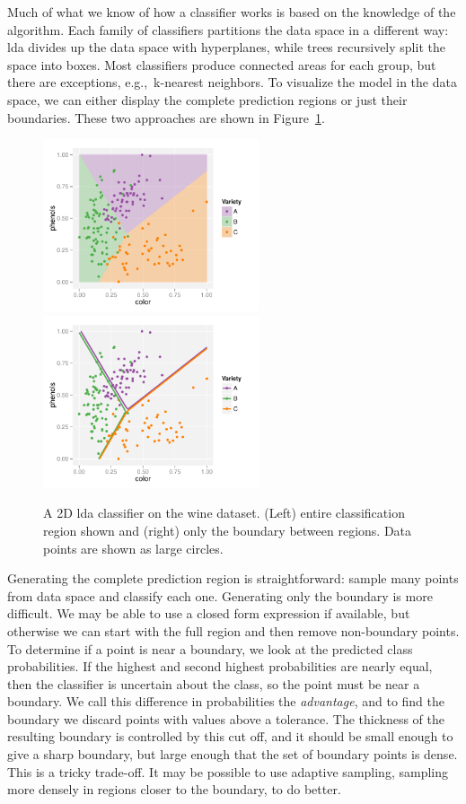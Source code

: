 \documentclass[preprint]{imsart}
\begin{document}
Much of what we know of how a classifier works is based on the knowledge of the algorithm.  Each family of classifiers partitions the data space in a different way: {\sc lda} \citep{fisher:1936} divides up the data space with hyperplanes, while trees \citep{breiman:1984} recursively split the space into boxes.  Most classifiers produce connected areas for each group, but there are exceptions, e.g.,\ k-nearest neighbors.  To visualize the model in the data space, we can either display the complete prediction regions or just their boundaries.  These two approaches are shown in Figure~\ref{fig:2d}.

\begin{figure}[htbp]
	\centering
	\includegraphics[height=2in]{class-2d-shade}
	\includegraphics[height=2in]{class-2d-boundary}
	\caption{A 2D {\sc lda} classifier on the wine dataset.  (Left) entire classification region shown and (right) only the boundary between regions. Data points are shown as large circles.}
	\label{fig:2d}
\end{figure}

Generating the complete prediction region is straightforward: sample many points from data space and classify each one.  Generating only the boundary is more difficult.  We may be able to use a closed form expression if available, but otherwise we can start with the full region and then remove non-boundary points.  To determine if a point is near a boundary, we look at the predicted class probabilities.  If the highest and second highest probabilities are nearly equal, then the classifier is uncertain about the class, so the point must be near a boundary. We call this difference in probabilities the {\em advantage}, and to find the boundary we discard points with values above a tolerance.  The thickness of the resulting boundary is controlled by this cut off, and it should be small enough to give a sharp boundary, but large enough that the set of boundary points is dense.  This is a tricky trade-off.  It may be possible to use adaptive sampling, sampling more densely in regions closer to the boundary, to do better.
\end{document}
